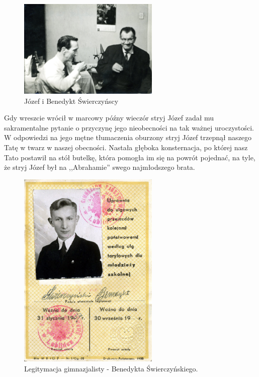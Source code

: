 \begin{figure}[!h]
\begin{center}
\includegraphics[width=0.6\textwidth]{photo/benedykt_jozef_swierczynscy.jpg}
\caption{Józef i Benedykt Świerczyńscy}
\end{center}
\end{figure}

Gdy wreszcie wrócił w marcowy późny wieczór stryj Józef zadał mu sakramentalne pytanie o przyczynę jego nieobecności na tak ważnej uroczystości. W odpowiedzi na jego mętne tłumaczenia oburzony stryj Józef trzepnął naszego Tatę w twarz w naszej obecności. Nastała głęboka konsternacja, po której nasz Tato postawił na stół butelkę, która pomogła im się na powrót pojednać, na tyle, że stryj Józef był na ,,Abrahamie'' swego najmłodszego brata.

\begin{figure}[!h]
\begin{center}
\includegraphics[width=0.6\textwidth]{photo/benedykt_swierczynski_legitymacja.jpg}
\caption{Legitymacja gimnazjalisty - Benedykta Świerczyńskiego.}
\end{center}
\end{figure}

